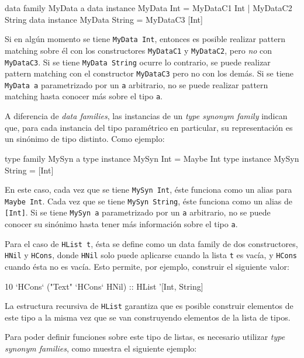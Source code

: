 \begin{code}
data family MyData a
data instance MyData Int = 
  MyDataC1 Int | MyDataC2 String
data instance MyData String = MyDataC3 [Int]
\end{code}

Si en algún momento se tiene \texttt{MyData Int}, entonces es posible realizar pattern matching sobre él con los constructores \texttt{MyDataC1} y \texttt{MyDataC2}, pero \textit{no} con \texttt{MyDataC3}. Si se tiene \texttt{MyData String} ocurre lo contrario, se puede realizar pattern matching con el constructor \texttt{MyDataC3} pero no con los demás. Si se tiene \texttt{MyData a} parametrizado por un \texttt{a} arbitrario, no se puede realizar pattern matching hasta conocer más sobre el tipo \texttt{a}.

A diferencia de \textit{data families}, las instancias de un \textit{type synonym family} indican que, para cada instancia del tipo paramétrico en particular, su representación es un sinónimo de tipo distinto. Como ejemplo:

\begin{code}
type family MySyn a
type instance MySyn Int = Maybe Int
type instance MySyn String = [Int]
\end{code}

En este caso, cada vez que se tiene \texttt{MySyn Int}, éste funciona como un alias para \texttt{Maybe Int}. Cada vez que se tiene \texttt{MySyn String}, éste funciona como un alias de \texttt{[Int]}. Si se tiene \texttt{MySyn a} parametrizado por un \texttt{a} arbitrario, no se puede conocer su sinónimo hasta tener más información sobre el tipo \texttt{a}.

Para el caso de \texttt{HList t}, ésta se define como un data family de dos constructores, \texttt{HNil} y \texttt{HCons}, donde \texttt{HNil} solo puede aplicarse cuando la lista \texttt{t} es vacía, y \texttt{HCons} cuando ésta no es vacía. Esto permite, por ejemplo, construir el siguiente valor:

\begin{code}
10 `HCons` ("Text" `HCons` HNil) :: HList '[Int, String]
\end{code}

La estructura recursiva de \texttt{HList} garantiza que es posible construir elementos de este tipo a la misma vez que se van construyendo elementos de la lista de tipos.

Para poder definir funciones sobre este tipo de listas, es necesario utilizar \textit{type synonym families}, como muestra el siguiente ejemplo:

